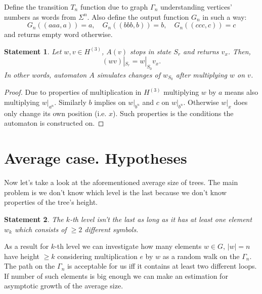 \documentclass[a4paper,12pt]{amsart}
\newtheorem{statement}{Statement}
\begin{document}
Define the transition $T_n$ function due to graph $\Gamma_n$ understanding vertices' numbers as words from $\Sigma^n$.
Also define the output function $G_n$ in such a way: 
$$G_n \left( (aaa, a) \right) = a,\quad G_n \left( (bbb, b) \right) = b, \quad G_n \left( (ccc, c) \right) = c$$
and returns empty word otherwise. 

\begin{statement}
	Let $w, v \in H^{(3)}$, $A(v)$ stops in state $S_r$ and returns $v_x$. Then,
	$$ (w v)|_{S_r} = w|_{S_0} v_x.$$
	In other words, automaton $A$ simulates changes of $w_{S_0}$ after multiplying $w$ on $v$.
\end{statement}

\begin{proof}
	Due to properties of multiplication in $H^{(3)}$ multiplying $w$ by $a$ means also multiplying $w|_{a^n}$. Similarly 
	$b$ implies on $w|_{b^n}$ and $c$ on $w|_{b^n}$. Otherwise $w|_x$ does only change its own position (i.e. $x$). Such 
	properties is the conditions the automaton is constructed on.
\end{proof}

\section{Average case. Hypotheses}

Now let's take a look at the aforementioned average size of trees. The main problem is we don't know which level 
is the last because we don't know properties of the tree's height. 

\begin{statement}
	The $k$-th level isn't the last as long as it has at least one element $w_k$ which consists of $\ge 2$ different 
	symbols. 
\end{statement}

As a result for $k$-th level we can investigate how many elements $w \in G, \, |w| = n$ have height $\ge k$ considering 
multiplication $e$ by $w$ as a random walk on the $\Gamma_n$. The path on the $\Gamma_n$ is acceptable for us iff it 
contains at least two different loops. If number of such elements is big enough we can make an estimation for 
asymptotic growth of the average size. 


\newpage
\end{document}
